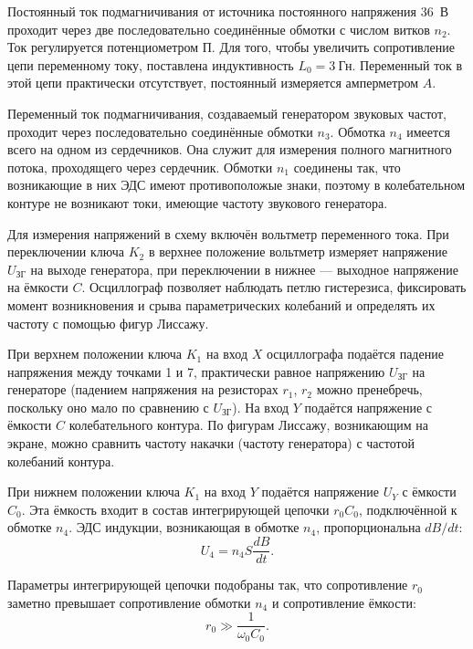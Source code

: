Постоянный ток подмагничивания от источника постоянного напряжения 36~В проходит через две последовательно соединённые обмотки с числом витков $n_2$. Ток регулируется потенциометром $\text{П}$. Для того, чтобы увеличить сопротивление цепи переменному току, поставлена индуктивность $L_0 = 3~$Гн. Переменный ток в этой цепи практически отсутствует, постоянный измеряется амперметром $A$.

Переменный ток подмагничивания, создаваемый генератором звуковых частот, проходит через последовательно соединённые обмотки $n_3$. Обмотка $n_4$ имеется всего на одном из сердечников. Она служит для измерения полного магнитного потока, проходящего через сердечник. Обмотки $n_1$ соединены так, что возникающие в них ЭДС имеют противоположые знаки, поэтому в колебательном контуре не возникают токи, имеющие частоту звукового генератора.

Для измерения напряжений в схему включён вольтметр переменного тока. При переключении ключа $K_2$ в верхнее положение вольтметр измеряет напряжение $U_\text{ЗГ}$ на выходе генератора, при переключении в нижнее --- выходное напряжение на ёмкости $C$. Осциллограф позволяет наблюдать петлю гистерезиса, фиксировать момент возникновения и срыва параметрических колебаний и определять их частоту с помощью фигур Лиссажу.

При верхнем положении ключа $K_1$ на вход $X$ осциллографа подаётся падение напряжения между точками 1 и 7, практически равное напряжению $U_{\text{ЗГ}}$ на генераторе (падением напряжения на резисторах $r_1$, $r_2$ можно пренебречь, поскольку оно мало по сравнению с $U_{\text{ЗГ}}$). На вход $Y$ подаётся напряжение с ёмкости $C$ колебательного контура. По фигурам Лиссажу, возникающим на экране, можно сравнить частоту накачки (частоту генератора) с частотой колебаний контура.

При нижнем положении ключа $K_1$ на вход $Y$ подаётся напряжение $U_Y$ с ёмкости $C_0$. Эта ёмкость входит в состав интегрирующей цепочки $r_0C_0$, подключённой к обмотке $n_4$. ЭДС индукции, возникающая в обмотке $n_4$, пропорциональна $dB/dt$:
\begin{equation*}
	U_4 = n_4S\frac{dB}{dt}.
\end{equation*}

Параметры интегрирующей цепочки подобраны так, что сопротивление $r_0$ заметно превышает сопротивление обмотки $n_4$ и сопротивление ёмкости:
\begin{equation*}
	r_0 \gg \frac{1}{\omega_0C_0}.
\end{equation*}

